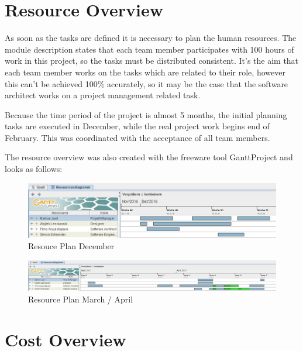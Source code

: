 \section{Resource Overview}

As soon as the tasks are defined it is necessary to plan the human resources.
The module description states that each team member participates with 100 hours
of work in this project, so the tasks must be distributed consistent. It's the
aim that each team member works on the tasks which are related to their role,
however this can't be achieved 100\% accurately, so it may be the case that the
software architect works on a project management related task.

Because the time period of the project is almost 5 months, the initial planning
tasks are executed in December, while the real project work begins end of
February. This was coordinated with the acceptance of all team members.

The resource overview was also created with the freeware tool GanttProject and
looks as follows:  

\begin{figure}[h!]
  \centering
     \includegraphics[width=1\textwidth]
     {res/projectPlan/ResourcePlan1.JPG}
     \captionsetup{justification=centering}
  \caption{Resouce Plan December}
  \label{fig:resource plan december}
\end{figure}

\begin{figure}[h!]
  \centering
     \includegraphics[width=1\textwidth]
     {res/projectPlan/ResourcePlan2.JPG}
     \captionsetup{justification=centering}
  \caption{Resource Plan March / April}
  \label{fig:resource plan march}
\end{figure}

\section{Cost Overview}

